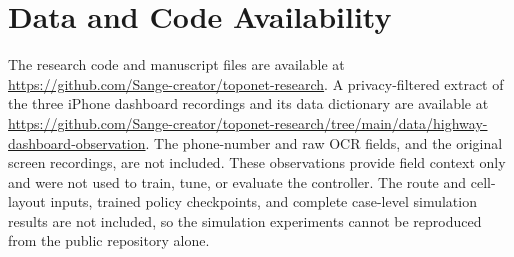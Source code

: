 \documentclass[fleqn,10pt,twoside]{IOEGC}
\begin{document}
\section*{Data and Code Availability}
The research code and manuscript files are available at \url{https://github.com/Sange-creator/toponet-research}. A privacy-filtered extract of the three iPhone dashboard recordings and its data dictionary are available at \url{https://github.com/Sange-creator/toponet-research/tree/main/data/highway-dashboard-observation}. The phone-number and raw OCR fields, and the original screen recordings, are not included. These observations provide field context only and were not used to train, tune, or evaluate the controller. The route and cell-layout inputs, trained policy checkpoints, and complete case-level simulation results are not included, so the simulation experiments cannot be reproduced from the public repository alone.



\end{document}
